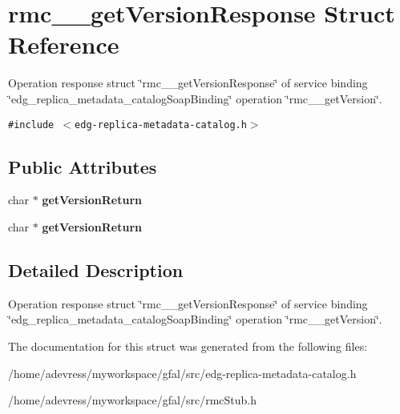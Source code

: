 \section{rmc\_\-\_\-get\-Version\-Response Struct Reference}
\label{structrmc____getVersionResponse}
Operation response struct \char`\"{}rmc\_\-\_\-get\-Version\-Response\char`\"{} of service binding \char`\"{}edg\_\-replica\_\-metadata\_\-catalog\-Soap\-Binding\char`\"{} operation \char`\"{}rmc\_\-\_\-get\-Version\char`\"{}.  


{\tt \#include $<$edg-replica-metadata-catalog.h$>$}

\subsection*{Public Attributes}
\begin{CompactItemize}
\item 
char $\ast$ \textbf{get\-Version\-Return}\label{structrmc____getVersionResponse_4829a72afe5bcfd930b9f6aee9580913}

\item 
char $\ast$ \textbf{get\-Version\-Return}\label{structrmc____getVersionResponse_4829a72afe5bcfd930b9f6aee9580913}

\end{CompactItemize}


\subsection{Detailed Description}
Operation response struct \char`\"{}rmc\_\-\_\-get\-Version\-Response\char`\"{} of service binding \char`\"{}edg\_\-replica\_\-metadata\_\-catalog\-Soap\-Binding\char`\"{} operation \char`\"{}rmc\_\-\_\-get\-Version\char`\"{}. 



The documentation for this struct was generated from the following files:\begin{CompactItemize}
\item 
/home/adevress/myworkspace/gfal/src/edg-replica-metadata-catalog.h\item 
/home/adevress/myworkspace/gfal/src/rmc\-Stub.h\end{CompactItemize}
